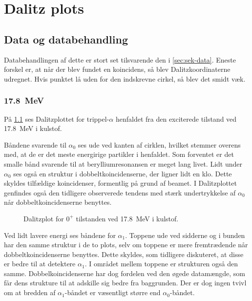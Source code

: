 \chapter{Dalitz plots}
\label{cha:dalitz-plots}



\section{Data og databehandling}
\label{sec:dalitz-data}

Databehandlingen af dette er stort set tilsvarende den i \cref{sec:sek-data}. Eneste forskel er, at når
der blev fundet en koincidens, så blev Dalitzkoordinaterne udregnet. Hvis punktet lå uden for den
indskrevne cirkel, så blev det smidt væk.

\subsection{\SI{17.8}{\MeV}}
\label{sec:dalitz-178}


På \cref{fig:dalitz-1077} ses Dalitzplottet for trippel-$\alpha$ henfaldet fra den exciterede tilstand
ved \SI{17.8}{\MeV} i kulstof. %

Båndene svarende til $\alpha_{0}$ ses ude ved kanten af cirklen, hvilket stemmer overens med, at de er
det meste energirige partikler i henfaldet. Som forventet er det smalle bånd svarende til at
berylliumresonansen er meget lang livet. Lidt under $\alpha_{0}$ ses også en struktur i dobbeltkoincidenserne,
der ligner lidt en klo. Dette skyldes tilfældige koincidenser, formentlig på grund af beamet. I
Dalitzplottet genfindes også den tidligere observerede tendens med stærk undertrykkelse af $\alpha_{0}$
når dobbeltkoincidenserne benyttes. 

\begin{figure}[t]
  \centering
  \hfill
  \caption{Dalitzplot for $0^{+}$ tilstanden ved \SI{17.8}{\MeV} i kulstof.}
  \label{fig:dalitz-1077}
\end{figure}

Ved lidt lavere energi ses båndene for $\alpha_{1}$. Toppene ude ved sidderne og i bunden har den samme
struktur i de to plots, selv om toppene er mere fremtrædende når dobbeltkoincidenserne
benyttes. Dette skyldes, som tidligere diskuteret, at disse er bedre til at detektere $\alpha_{1}$. I
området mellem toppene er strukturen også den samme. Dobbelkoincidenserne har dog fordelen ved den
øgede datamængde, som får dens strukture til at adskille sig bedre fra baggrunden. Der er dog ingen
tvivl om at bredden af $\alpha_{1}$-båndet er væsentligt større end $\alpha_{0}$-båndet. 

